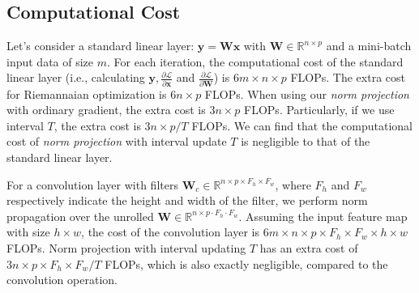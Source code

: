 \documentclass[twocolumn]{article}
\newcommand{\TODO}[1]{\textcolor{red}{TODO: }\textcolor{red}{\emph{#1}}}
\begin{document}
\subsection{Computational Cost}
\label{sec:computationCost}
Let's consider a standard linear layer: $\mathbf{y}=\mathbf{W} \mathbf{x}$ with $\mathbf{W} \in \mathbb{R}^{n \times p}$ and a mini-batch input data of size $m$. For each iteration, the computational cost of the standard linear layer (i.e., calculating $\mathbf{y}, \frac{\partial \mathcal{L} }{\partial \mathbf{x}}$ and $\frac{\partial \mathcal{L} }{\partial \mathbf{W}}$) is $6m\times n\times p$ FLOPs. The extra cost for Riemannaian optimization is $6n\times p$ FLOPs. When using our \emph{norm projection} with ordinary gradient, the extra cost is $3n\times p$ FLOPs. Particularly, if we use interval $T$, the extra cost is ${3n\times p}/ {T}$ FLOPs. We can find that the computational cost of \emph{norm projection} with interval update $T$ is negligible to that of the standard linear layer.%

For a convolution layer with filters $\mathbf{W}_c \in \mathbb{R}^{n \times p \times F_h \times F_w}$, where $F_h$ and $F_w$ respectively indicate the height and width of the filter, we perform norm propagation over the unrolled $\mathbf{W} \in \mathbb{R}^{n \times p\cdot F_h \cdot F_w}$. Assuming the input feature map with size $h \times w$, the cost of the convolution layer is $6m\times n\times p\times F_h\times  F_w\times  h\times w$ FLOPs. Norm projection with interval updating $T$ has an extra cost of ${3n\times p\times F_h\times  F_w}/{T}$ FLOPs, which is also exactly negligible, compared to the convolution operation.%

%
\end{document}
